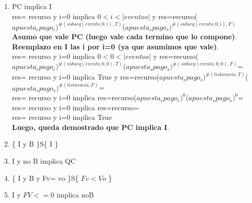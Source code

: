 \documentclass[10pt,a4paper]{article}
\begin{document}
\begin{flushleft}
\begin{enumerate} \setlength\itemsep{0cm}
	\item PC implica I\\
	res= recurso y i=0 implica $0<i<|eventos|$ y res=recurso($apuesta_cpago_c)^{\#(subseq(evento,0,i),T)}$($apuesta_spago_s)^{\#(subseq(evento,0,i),F)}$\\
	\vspace{2mm}
	\textbf{Asumo que vale PC (luego vale cada termino que lo compone)}.\\
	\vspace{2mm}
	\textbf{Reemplazo en I las i por i=0 (ya que asumimos que vale)}.\\
	\vspace{2mm}
	res= recurso y i=0 implica $0<0<|eventos|$ y res=recurso($apuesta_cpago_c)^{\#(subseq(evento,0,0),T)}$($apuesta_spago_s)^{\#(subseq(evento,0,0),F)}$=\\
	\vspace{2mm}
	res= recurso y i=0 implica True y res=recurso($apuesta_cpago_c)^{\#(lista vacia,T)}$($apuesta_spago_s)^{\#(lista vacia,F)}$=\\
	\vspace{2mm}
	res= recurso y i=0 implica res=recurso($apuesta_cpago_c)^{0}$($apuesta_spago_s)^{0}$=\\
	\vspace{2mm}
	res= recurso y i=0 implica res=recurso=\\
	\vspace{2mm}
	res= recurso y i=0 implica True \\
	\vspace{2mm}
	\textbf{Luego, queda demostrado que PC implica I}.
	\item \{ I y B \}S\{ I \}\\
	\item I y no B implica QC\\
	\item \{ I y B  y Fv= vo \}S\{ $Fv<Vo$ \}\\
	\item I y $FV<=0$ implica noB \\



\end{enumerate}

\end{flushleft}
\end{document}
